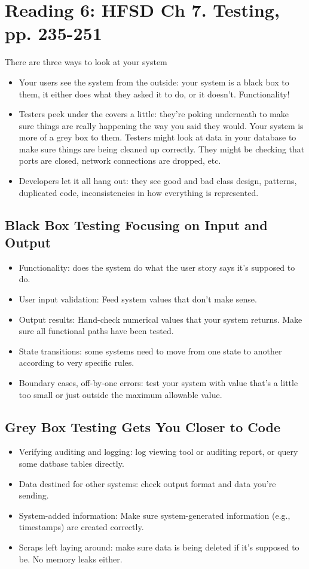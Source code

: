 \documentclass[letterpaper]{article}
\begin{document}
\section{Reading 6: HFSD Ch 7. Testing, pp. 235-251}
There are three ways to look at your system
\begin{itemize}
    \item Your users see the system from the outside: your system is a black box to them, it either does what they asked it to do, or it doesn't. Functionality!
    \item Testers peek under the covers a little: they're poking underneath to make sure things are really happening the way you said they would. Your system is more of a grey box to them. Testers might look at data in your database to make sure things are being cleaned up correctly. They might be checking that ports are closed, network connections are dropped, etc.  
    \item Developers let it all hang out: they see good and bad class design, patterns, duplicated code, inconsistencies in how everything is represented. 
\end{itemize}

\subsection{Black Box Testing Focusing on Input and Output}
\begin{itemize}
    \item Functionality: does the system do what the user story says it's supposed to do.  
    \item User input validation: Feed system values that don't make sense.
    \item Output results: Hand-check numerical values that your system returns. Make sure all functional paths have been tested. 
    \item State transitions: some systems need to move from one state to another according to very specific rules. 
    \item Boundary cases, off-by-one errors: test your system with value that's a little too small or just outside the maximum allowable value. 
\end{itemize}

\subsection{Grey Box Testing Gets You Closer to Code}
\begin{itemize}
    \item Verifying auditing and logging: log viewing tool or auditing report, or query some datbase tables directly. 
    \item Data destined for other systems: check output format and data you're sending. 
    \item System-added information: Make sure system-generated information (e.g., timestamps) are created correctly. 
    \item Scraps left laying around: make sure data is being deleted if it's supposed to be. No memory leaks either. 
\end{itemize}
\end{document}
